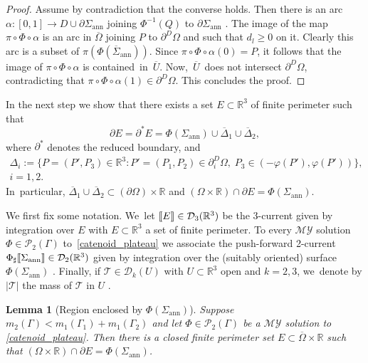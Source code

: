 \documentclass[JEP,XML,SOM,Unicode, NoFloatCountersInSection,published]{cedram}
\newcommand{\R}{\mathbb{R}}
\let\Om\Omega
\newcommand{\jump}[1]{\textup{\textlbrackdbl}{#1}\textup{\textrbrackdbl}}
\newcommand{\openannulus}{\Sigma_\mathrm{ann}}
\newcommand{\immclosedann}{\Phi({\overline\Sigma}_\mathrm{ann})}
\newtheorem{lemma}[theorem]{Lemma}
\theoremstyle{definition}
\begin{document}
\begin{proof}
Assume by contradiction that the converse holds. Then there is an arc $\alpha:[0,1]\to D\cup\partial\openannulus$ joining $\Phi^{-1}(Q)$ to $\partial\openannulus$ .
The image of the
map $\pi\circ\Phi\circ \alpha$ is an arc in $\overline \Omega$
joining $P$ to $\partial^D\Om$ and such that $d_l\geq0$ on it.
Clearly this arc is a subset of $\pi(\immclosedann)$. Since $\pi\circ\Phi\circ \alpha(0)=P$, it follows that the image of $\pi\circ\Phi\circ \alpha$ is contained~in~$\overline U$. Now,~$\overline U$~does not intersect $\partial^D\Om$, contradicting that $\pi\circ\Phi\circ \alpha(1)\in \partial^D\Om$. This concludes the proof.
\end{proof}

In the next step we show
that there exists a set $E\subset\R^3$ of finite perimeter such that
\[
\partial E=\partial^*E=\Phi(\openannulus)\cup\overline\Delta_1\cup\overline\Delta_2,
\]
where $\partial^*$ denotes the reduced boundary, and
\begin{multline}\label{delta}
\Delta_i:=\{P=(P',P_3)\in \R^3:P'=(P_1,P_2)\in \partial_i^D\Om, \;P_3\in (-\varphi(P'),\varphi(P'))\},
\\
i=1,2.
\end{multline}
In~particular, $\overline\Delta_1\cup\overline\Delta_2\subset(\partial\Om)\times\R$ and
$(\Om\times\R)\cap\partial E=\Phi(\openannulus)$.

We first fix some notation. We~let $\jump{E}\in\mathcal{D}_3(\R^3)$ be the 3-current given by integration over $E$ with $E\subset\R^3$ a set of finite perimeter.
To every $\mathcal{MY}$ solution
$\Phi\in\mathcal{P}_2(\Gamma)$
to~\eqref{catenoid_plateau} we associate the push-forward 2-current $\Phi_\sharp\jump{\openannulus}\in\mathcal D_2(\R^3)$ given by integration over the (suitably oriented) surface $\Phi(\openannulus)$
\cite[\S 7.4.2]{Krantz-Parks}.
Finally, if $\mathcal{T}\in\mathcal{D}_k(U)$ with $U\subset\R^3$ open and $k=2,3$, we~denote by $|\mathcal{T}|$ the mass of $\mathcal{T}$ in $U$
\cite[p.\,358]{Federer}.

\begin{lemma}[Region enclosed by $\Phi(\openannulus)$]
\label{lem:region_enclosed_by_Phi(Sigma_min)}
Suppose $m_2(\Gamma)<m_1(\Gamma_1)+m_1(\Gamma_2)$ and let $\Phi\in\mathcal{P}_2(\Gamma)$ be a $\mathcal{MY}$ solution to \eqref{catenoid_plateau}.
Then there is a closed
finite perimeter set $E\subset\overline\Om\times\R$ such that $(\Om\times\R)\cap\partial E=\Phi(\openannulus)$.
\end{lemma}
\end{document}

